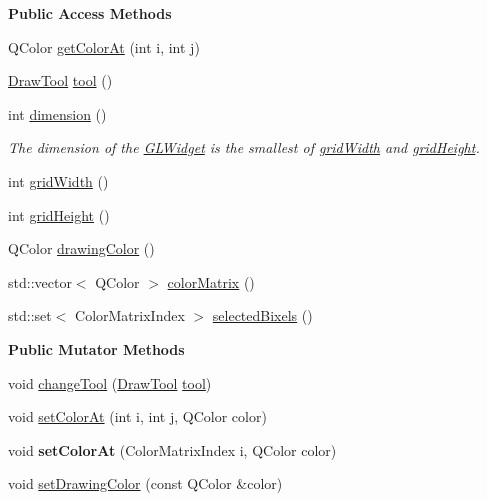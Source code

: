 \begin{Indent}{\bf Public Access Methods}\par
\begin{DoxyCompactItemize}
\item 
Q\-Color \hyperlink{classGLWidget_ab67274be71693397e33bcb5f644e8d6a}{get\-Color\-At} (int i, int j)
\item 
\hyperlink{classGLWidget_a9fba3eba78950865febd4547be0641d0}{Draw\-Tool} \hyperlink{classGLWidget_ad7b5ee8248e47c8c1c9c1525c9e5acce}{tool} ()
\item 
int \hyperlink{classGLWidget_a0ecdf8ea93e62ab9d294714e59dafd64}{dimension} ()
\begin{DoxyCompactList}\small\item\em The dimension of the \hyperlink{classGLWidget}{G\-L\-Widget} is the smallest of \hyperlink{classGLWidget_a272046b9cb9f26f5b382f9a121672570}{grid\-Width} and \hyperlink{classGLWidget_a419c32eef067d7157b00904dd52bdb8b}{grid\-Height}. \end{DoxyCompactList}\item 
int \hyperlink{classGLWidget_a272046b9cb9f26f5b382f9a121672570}{grid\-Width} ()
\item 
int \hyperlink{classGLWidget_a419c32eef067d7157b00904dd52bdb8b}{grid\-Height} ()
\item 
Q\-Color \hyperlink{classGLWidget_a8ea9c1e6b1013897e22dc7121f377113}{drawing\-Color} ()
\item 
std\-::vector$<$ Q\-Color $>$ \hyperlink{classGLWidget_aab1b8762be4b33d384e3689427c2addc}{color\-Matrix} ()
\item 
std\-::set$<$ Color\-Matrix\-Index $>$ \hyperlink{classGLWidget_ab07a9ee710f42da54d0158cbdedf3674}{selected\-Bixels} ()
\end{DoxyCompactItemize}
\end{Indent}
\begin{Indent}{\bf Public Mutator Methods}\par
\begin{DoxyCompactItemize}
\item 
void \hyperlink{classGLWidget_ab712fb8b0f65e689a21749062bd2f8d7}{change\-Tool} (\hyperlink{classGLWidget_a9fba3eba78950865febd4547be0641d0}{Draw\-Tool} \hyperlink{classGLWidget_ad7b5ee8248e47c8c1c9c1525c9e5acce}{tool})
\item 
void \hyperlink{classGLWidget_a5abf53a0389c884788c3c106a7a1263d}{set\-Color\-At} (int i, int j, Q\-Color color)
\item 
\hypertarget{classGLWidget_a94d23dd2ecad4f803fee7eb82a6bb4d3}{void {\bfseries set\-Color\-At} (Color\-Matrix\-Index i, Q\-Color color)}\label{classGLWidget_a94d23dd2ecad4f803fee7eb82a6bb4d3}

\item 
void \hyperlink{classGLWidget_a087325630069166821ada20445fc89a6}{set\-Drawing\-Color} (const Q\-Color \&color)
\end{DoxyCompactItemize}
\end{Indent}
